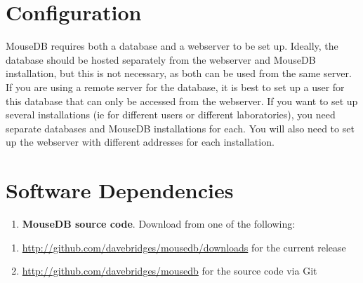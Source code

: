 \documentclass[letterpaper,10pt,english]{sphinxmanual}
\begin{document}
\section{Configuration}
\label{installation:configuration}
MouseDB requires both a database and a webserver to be set up.  Ideally, the database should be hosted separately from the webserver and MouseDB installation, but this is not necessary, as both can be used from the same server.  If you are using a remote server for the database, it is best to set up a user for this database that can only be accessed from the webserver.  If you want to set up several installations (ie for different users or different laboratories), you need separate databases and MouseDB installations for each.  You will also need to set up the webserver with different addresses for each installation.


\section{Software Dependencies}
\label{installation:software-dependencies}\begin{enumerate}
\item {} 
\textbf{MouseDB source code}.  Download from one of the following:

\end{enumerate}
\begin{enumerate}
\item {} 
\href{http://github.com/davebridges/mousedb/downloads}{http://github.com/davebridges/mousedb/downloads} for the current release

\item {} 
\href{http://github.com/davebridges/mousedb}{http://github.com/davebridges/mousedb} for the source code via Git

\end{enumerate}
\end{document}

